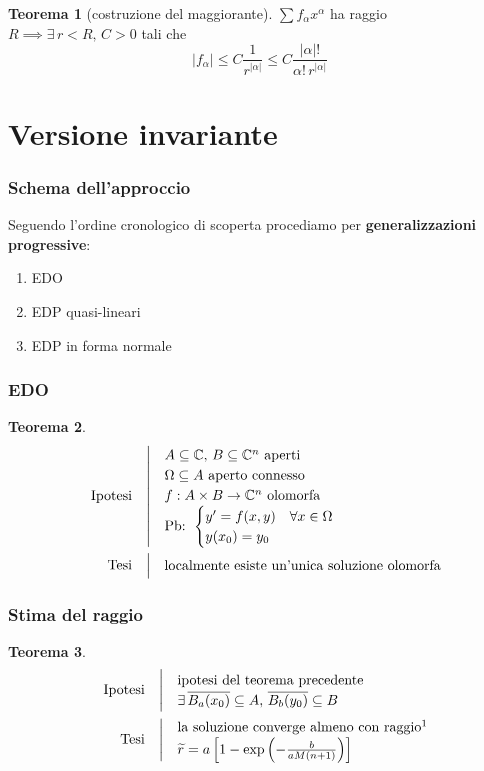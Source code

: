\documentclass[serif,notheorems]{beamer}
\makeatletter
\newenvironment{ipotesi}%
{\quad\left|\quad\def\arraystretch{1.2}\begin{array}{@{}l@{}}}%
{\end{array}\right.}
\newcommand{\hpth}[2]
{
\begin{align*}
\quad
\text{Ipotesi}
&\begin{ipotesi}
#1
\end{ipotesi}\\
\text{Tesi}
&\begin{ipotesi}
#2
\end{ipotesi}
\end{align*}
}
\theoremstyle{definition} %
\newtheorem{theorem}{Teorema}[section] %
\theoremstyle{remark}
\makeatother
\begin{document}
\begin{frame}
\begin{theorem}[costruzione del maggiorante]
$\sum f_\alpha x^\alpha$ ha raggio $R \implies \exists \, r<R, \, C>0$ tali che 
$$|f_\alpha | \leq C \frac{1}{r^{|\alpha |}} \leq C \frac{|\alpha |!}{\alpha ! \, r^{|\alpha |}}$$
\end{theorem}
\end{frame}


\section{Versione invariante}

\begin{frame}
\frametitle{Schema dell'approccio}
Seguendo l'ordine cronologico di scoperta procediamo per \textbf{generalizzazioni progressive}:
\begin{enumerate}
\item EDO
\item EDP quasi-lineari
\item EDP in forma normale
\end{enumerate}
\end{frame}


\begin{frame}
\frametitle{EDO}
\begin{theorem}
\hpth{
A \subseteq \mathbb{C}, \, B\subseteq \mathbb{C}^n \text{ aperti }\\
\Omega \subseteq A \text{ aperto connesso}\\
f:A\times B\rightarrow\mathbb{C}^n \text{ olomorfa}\\
\text{Pb: }
\begin{cases}
y' = f(x,y) \quad \forall x \in \Omega \\
y(x_0)=y_0
\end{cases}\\
}
{
\text{localmente esiste un'unica soluzione olomorfa}
}
\end{theorem}
\end{frame}

\begin{frame}
\frametitle{Stima del raggio}
\begin{theorem}
\hpth{
\text{ipotesi del teorema precedente}\\
\exists \, \overline{B_a(x_0)}\subseteq A,\,\overline{B_b(y_0)} \subseteq B\\
}{
\text{la soluzione converge almeno con raggio}\footnotemark \\
\widetilde{r}= a\left[ 1-\exp\left( -\frac{b}{aM(n+1)}\right) \right] \\
}
\end{theorem}
\end{frame}
\end{document}
